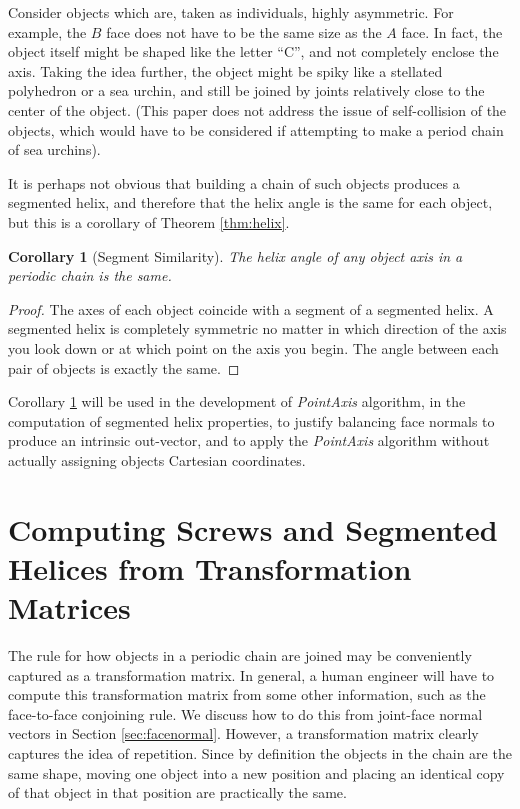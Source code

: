 \documentclass[11pt]{article}
\newtheorem{corollary}{Corollary}
\begin{document}
{Consider
objects which are, taken as individuals, highly asymmetric.
For example,
the $B$ face does not have to be the same size as the $A$ face. In fact,
the object itself might be shaped like the letter ``C'', and not completely
enclose the axis. Taking the idea further, the object might be spiky
like a stellated polyhedron or a sea urchin, and still be joined by
joints relatively close to the center of the object. (This paper does not
address the issue of self-collision of the objects,
which would have to be considered if attempting to make a period chain
of sea urchins).

It is perhaps not obvious that building a chain of such objects
produces a segmented helix, and therefore that the helix angle is the
same for each object, but this is a corollary of Theorem \ref{thm:helix}.


\begin{corollary}[Segment Similarity]
  The helix angle of any object axis in a periodic chain is the same.
  \label{cor:symmetric}
\end{corollary}

\begin{proof}
  The axes of each object coincide with a segment of a segmented helix.
  A segmented helix is completely symmetric no matter in which direction
  of the axis you look down or at which point on the axis you begin. The angle between each pair of objects
  is exactly the same.
\end{proof}

Corollary \ref{cor:symmetric} will be used in the development of {\em PointAxis} algorithm,
in the computation of segmented helix properties, to justify balancing face normals
to produce an intrinsic out-vector, and to apply the {\em PointAxis} algorithm
without actually assigning objects Cartesian coordinates.

\section{Computing Screws and Segmented Helices from Transformation Matrices}
\label{sec:screws}

The rule for how objects in a periodic chain are joined may be
conveniently captured as a transformation
matrix.
In general, a human engineer will have to compute this transformation matrix from some other
information, such as the face-to-face conjoining rule.
We discuss how to do this from joint-face normal
vectors in Section \ref{sec:facenormal}. However, a transformation matrix clearly
captures the idea of repetition.
Since by definition the objects in the chain are the same shape,
moving one object into a new position and placing an identical copy of that object in that position
are practically the same.

}
\end{document}
